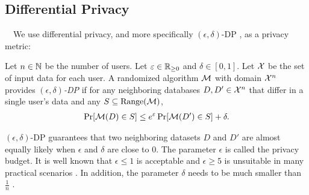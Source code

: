 \subsection{Differential Privacy}
\label{sub:privacy}
~~We use differential privacy, and more specifically $(\epsilon,\delta)$-DP \cite{DP}, as a privacy metric: 

\begin{definition}  \label{def:DP} 
Let $n \in \mathbb{N}$ be the number of users. 
Let $\varepsilon \in \mathbb{R}_{\ge0}$ and $\delta \in [0,1]$. 
Let $\mathcal{X}$ be the set of input data for each user. 
A randomized algorithm $\mathcal{M}$ with domain $\mathcal{X}^n$ 
provides \emph{$(\epsilon,\delta)$-DP} if for any neighboring databases $D,D' \in \mathcal{X}^n$ that differ in a single user's data and any 
$S \subseteq \mathrm{Range}(\mathcal{M})$, 
\begin{align*}
\Pr[\mathcal{M}(D) \in S] \leq e^\varepsilon \Pr[\mathcal{M}(D') \in S] + \delta.
\end{align*}
\end{definition}
$(\epsilon,\delta)$-DP guarantees that two neighboring datasets $D$ and $D'$ are almost equally likely when $\epsilon$ and $\delta$ are close to $0$. 
The parameter $\epsilon$ is called the privacy budget. 
It is well known that $\epsilon \leq 1$ is acceptable and $\epsilon \geq 5$ is unsuitable in many practical scenarios \cite{DP_Li}. 
In addition, the parameter $\delta$ needs to be much smaller than $\frac{1}{n}$ \cite{Barber_arXiv14,DP}. 

